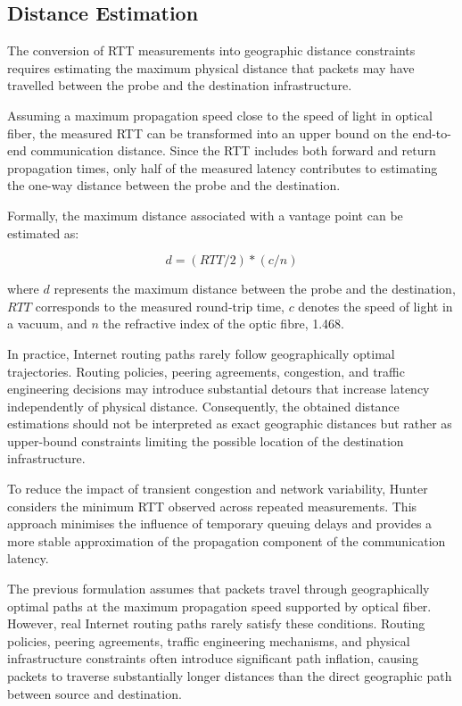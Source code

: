 \subsection{Distance Estimation}
\label{sc:hunter_multilateration_distance_estimation}

The conversion of RTT measurements into geographic distance constraints requires estimating the maximum physical distance that packets may have travelled between the probe and the destination infrastructure.

Assuming a maximum propagation speed close to the speed of light in optical fiber, the measured RTT can be transformed into an upper bound on the end-to-end communication distance. Since the RTT includes both forward and return propagation times, only half of the measured latency contributes to estimating the one-way distance between the probe and the destination.

Formally, the maximum distance associated with a vantage point can be estimated as:

\begin{equation*}
    d = (RTT/2) * (c/n)   
\end{equation*}

where $d$ represents the maximum distance between the probe and the destination, $RTT$ corresponds to the measured round-trip time, $c$ denotes the speed of light in a vacuum, and $n$ the refractive index of the optic fibre, 1.468.

In practice, Internet routing paths rarely follow geographically optimal trajectories. Routing policies, peering agreements, congestion, and traffic engineering decisions may introduce substantial detours that increase latency independently of physical distance. Consequently, the obtained distance estimations should not be interpreted as exact geographic distances but rather as upper-bound constraints limiting the possible location of the destination infrastructure.

To reduce the impact of transient congestion and network variability, Hunter considers the minimum RTT observed across repeated measurements. This approach minimises the influence of temporary queuing delays and provides a more stable approximation of the propagation component of the communication latency.

The previous formulation assumes that packets travel through geographically optimal paths at the maximum propagation speed supported by optical fiber. However, real Internet routing paths rarely satisfy these conditions. Routing policies, peering agreements, traffic engineering mechanisms, and physical infrastructure constraints often introduce significant path inflation, causing packets to traverse substantially longer distances than the direct geographic path between source and destination.

